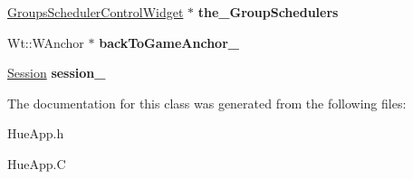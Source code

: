 \begin{DoxyCompactItemize}
\item 
\hyperlink{classGroupsSchedulerControlWidget}{Groups\+Scheduler\+Control\+Widget} $\ast$ {\bfseries the\+\_\+\+Group\+Schedulers}\hypertarget{classHueApp_aeabe2e1cb483ebf5de2fe7e8ae137063}{}\label{classHueApp_aeabe2e1cb483ebf5de2fe7e8ae137063}

\item 
Wt\+::\+W\+Anchor $\ast$ {\bfseries back\+To\+Game\+Anchor\+\_\+}\hypertarget{classHueApp_a76a68ad13aca8a4d13558ce355f02278}{}\label{classHueApp_a76a68ad13aca8a4d13558ce355f02278}

\item 
\hyperlink{classSession}{Session} {\bfseries session\+\_\+}\hypertarget{classHueApp_a38aedace7f2be9252275e24d8e09f46f}{}\label{classHueApp_a38aedace7f2be9252275e24d8e09f46f}

\end{DoxyCompactItemize}


The documentation for this class was generated from the following files\+:\begin{DoxyCompactItemize}
\item 
Hue\+App.\+h\item 
Hue\+App.\+C\end{DoxyCompactItemize}
